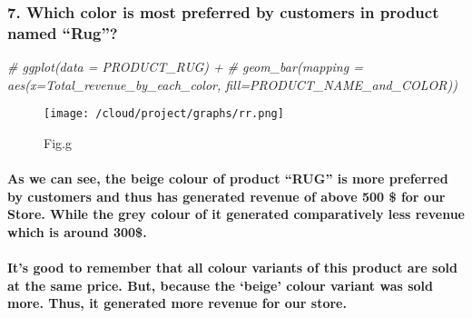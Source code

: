 \documentclass[
]{article}
\newenvironment{Shaded}{\begin{snugshade}}{\end{snugshade}}
\newcommand{\CommentTok}[1]{\textcolor[rgb]{0.56,0.35,0.01}{\textit{#1}}}
\begin{document}
\hypertarget{which-color-is-most-preferred-by-customers-in-product-named-rug-1}{%
\subsubsection{7. Which color is most preferred by customers in product
named
``Rug''?}\label{which-color-is-most-preferred-by-customers-in-product-named-rug-1}}

\begin{Shaded}
\begin{Highlighting}[]
\CommentTok{\# ggplot(data = PRODUCT\_RUG) +}
\CommentTok{\#   geom\_bar(mapping = aes(x=Total\_revenue\_by\_each\_color, fill=PRODUCT\_NAME\_and\_COLOR))}
\end{Highlighting}
\end{Shaded}

\begin{figure}
\centering
\texttt{[image: /cloud/project/graphs/rr.png]}
\caption{Fig.g}
\end{figure}

\hypertarget{as-we-can-see-the-beige-colour-of-product-rug-is-more-preferred-by-customers-and-thus-has-generated-revenue-of-above-500-for-our-store.-while-the-grey-colour-of-it-generated-comparatively-less-revenue-which-is-around-300.}{%
\paragraph{As we can see, the beige colour of product ``RUG'' is more
preferred by customers and thus has generated revenue of above 500 \$
for our Store. While the grey colour of it generated comparatively less
revenue which is around
300\$.}\label{as-we-can-see-the-beige-colour-of-product-rug-is-more-preferred-by-customers-and-thus-has-generated-revenue-of-above-500-for-our-store.-while-the-grey-colour-of-it-generated-comparatively-less-revenue-which-is-around-300.}}

\hypertarget{its-good-to-remember-that-all-colour-variants-of-this-product-are-sold-at-the-same-price.-but-because-the-beige-colour-variant-was-sold-more.-thus-it-generated-more-revenue-for-our-store.}{%
\paragraph{It's good to remember that all colour variants of this
product are sold at the same price. But, because the `beige' colour
variant was sold more. Thus, it generated more revenue for our
store.}\label{its-good-to-remember-that-all-colour-variants-of-this-product-are-sold-at-the-same-price.-but-because-the-beige-colour-variant-was-sold-more.-thus-it-generated-more-revenue-for-our-store.}}
\end{document}
